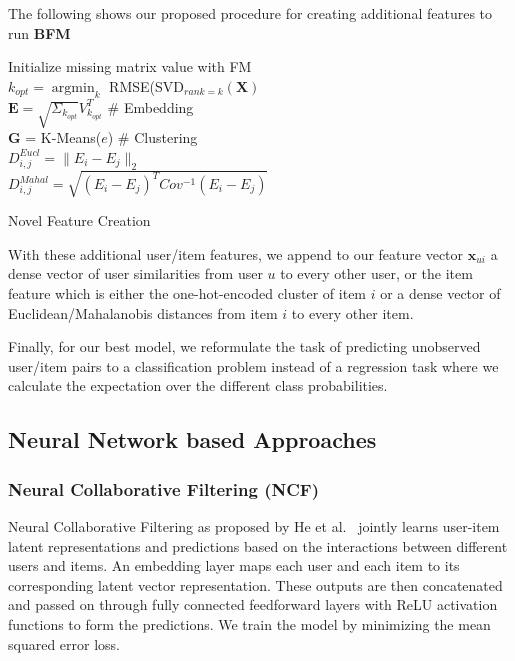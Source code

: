 \documentclass[10pt,conference,compsocconf]{IEEEtran}
\DeclareMathOperator*{\argmin}{argmin}   %
\begin{document}
    The following  shows our proposed procedure for creating additional features to run \textbf{BFM}

    \begin{algorithm}
        Initialize missing matrix value with FM\\
        $k_{opt}=\argmin_{k}$ RMSE(SVD$_{rank=k}(\mathbf{ X })$\\
        $\mathbf{E} = \sqrt{\Sigma_{k_{opt}}}V_{k_{opt}}^T$ \# Embedding\\
        $\mathbf{ G }$ = K-Means($e$) \# Clustering\\
         {
             {
                $D_{i,j} ^{Eucl} = \|E_i - E_j\|_2$ \\
                $D_{i,j} ^{Mahal} = \sqrt{(E_i-E_j)^TCov^{-1}(E_i-E_j)}$
            }
        }
        \caption{Novel Feature Creation}
        \label{alg:algo1}
    \end{algorithm}

    With these additional user/item features, we append to our feature vector $\mathbf{x}_{ui}$ a dense vector of user similarities from user $u$ to every other user, or the item feature which is either the one-hot-encoded cluster of item $i$ or a dense vector of Euclidean/Mahalanobis distances from item $i$ to every other item.

    Finally, for our best model, we reformulate the task of predicting unobserved user/item pairs to a classification problem instead of a regression task where we calculate the expectation over the different class probabilities.

    \subsection{Neural Network based Approaches}

    \subsubsection{Neural Collaborative Filtering (NCF)}
    Neural Collaborative Filtering as proposed by He et al.~\cite{DBLP:journals/corr/abs-1708-05031}
    jointly learns user-item latent representations and predictions based on the interactions between
    different users and items.
    An embedding layer maps each user and each item to its corresponding latent vector representation.
    These outputs are then concatenated and passed on through fully connected feedforward layers with ReLU activation functions to form the predictions.
    We train the model by minimizing the mean squared error loss.
\end{document}
